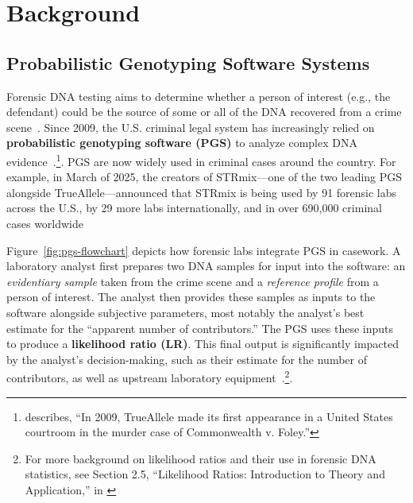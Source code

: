 \section{Background}
\label{sec:background}

\subsection{Probabilistic Genotyping Software Systems}
\label{sec:background-pgs}
Forensic DNA testing aims to determine whether a person of interest (e.g., the defendant) could be the source of some or all of the DNA recovered from a crime scene~\cite{butler2024dna}. Since 2009, the U.S. criminal legal system has increasingly relied on \textbf{probabilistic genotyping software (PGS)} to analyze complex DNA evidence~\cite{moss2015admissibility, foley}.\footnote{\citet{moss2015admissibility} describes, ``In 2009, TrueAllele made its first appearance in a United States courtroom in the murder case of Commonwealth v. Foley.''}. PGS are now widely used in criminal cases around the country. For example, in March of 2025, the creators of STRmix---one of the two leading PGS alongside TrueAllele---announced that STRmix is being used by 91 forensic labs across the U.S., by 29 more labs internationally, and in over 690,000 criminal cases worldwide~\cite{strmix2025use}
 

Figure~\ref{fig:pgs-flowchart} depicts how forensic labs integrate PGS in casework. A laboratory analyst first prepares two DNA samples for input into the software: an \emph{evidentiary sample} taken from the crime scene and a \emph{reference profile} from a person of interest. The analyst then provides these samples as inputs to the software alongside subjective parameters, most notably the analyst's best estimate for the ``apparent number of contributors.'' The PGS uses these inputs to produce a \textbf{likelihood ratio (LR)}. This final output is significantly impacted by the analyst's decision-making, such as their estimate for the number of contributors, as well as upstream laboratory equipment~\cite{butler2024dna, paoletti2005empirical,coble2015uncertainty}.\footnote{For more background on likelihood ratios and their use in forensic DNA statistics, see Section 2.5, ``Likelihood Ratios: Introduction to Theory and Application,'' in \citet{butler2024dna}}. 


